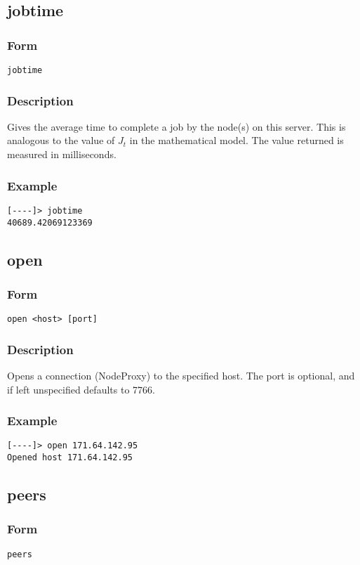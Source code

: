 \documentclass[12pt]{article}
\begin{document}
\subsection{jobtime}
\subsubsection{Form}
\begin{verbatim}
jobtime
\end{verbatim}
\subsubsection{Description}
Gives the average time to complete a job by the node(s) on this server. This is analogous to the value of $J_{t}$ in the mathematical model. The value returned is measured in milliseconds.
\subsubsection{Example}
\begin{verbatim}
[----]> jobtime
40689.42069123369
\end{verbatim}

\subsection{open}
\subsubsection{Form}
\begin{verbatim}
open <host> [port]
\end{verbatim}
\subsubsection{Description}
Opens a connection (NodeProxy) to the specified host. The port is optional, and if left unspecified defaults to 7766.
\subsubsection{Example}
\begin{verbatim}
[----]> open 171.64.142.95
Opened host 171.64.142.95
\end{verbatim}

\subsection{peers}
\subsubsection{Form}
\begin{verbatim}
peers
\end{verbatim}
\end{document}
